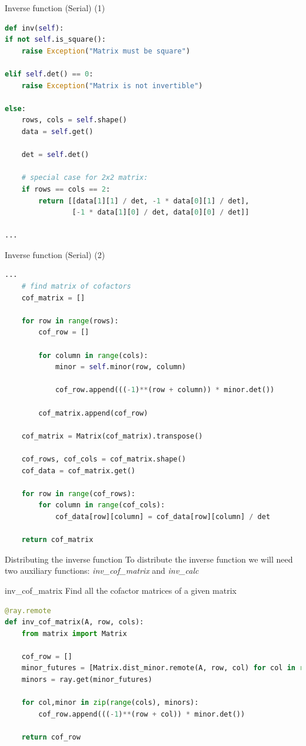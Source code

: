 \documentclass{beamer}
\begin{document}
\begin{frame}[fragile]{Inverse function (Serial) (1)}
    \begin{lstlisting}[language=Python]
def inv(self):
if not self.is_square():
    raise Exception("Matrix must be square")

elif self.det() == 0:
    raise Exception("Matrix is not invertible")

else:
    rows, cols = self.shape()
    data = self.get()

    det = self.det()

    # special case for 2x2 matrix:
    if rows == cols == 2:
        return [[data[1][1] / det, -1 * data[0][1] / det],
                [-1 * data[1][0] / det, data[0][0] / det]]

...
        \end{lstlisting}
\end{frame}

\begin{frame}[fragile]{Inverse function (Serial) (2)}
    \begin{lstlisting}[language=Python]
...
    # find matrix of cofactors
    cof_matrix = []

    for row in range(rows):
        cof_row = []

        for column in range(cols):
            minor = self.minor(row, column)

            cof_row.append(((-1)**(row + column)) * minor.det())

        cof_matrix.append(cof_row)

    cof_matrix = Matrix(cof_matrix).transpose()

    cof_rows, cof_cols = cof_matrix.shape()
    cof_data = cof_matrix.get()

    for row in range(cof_rows):
        for column in range(cof_cols):
            cof_data[row][column] = cof_data[row][column] / det

    return cof_matrix
        \end{lstlisting}
\end{frame}

\begin{frame}[fragile]{Distributing the inverse function}
    To distribute the inverse function we will need two auxiliary functions: \textit{inv\_cof\_matrix} and \textit{inv\_calc}
\end{frame}

\begin{frame}[fragile]{inv\_cof\_matrix}
    Find all the cofactor matrices of a given matrix
    \begin{lstlisting}[language=Python]
@ray.remote
def inv_cof_matrix(A, row, cols):
    from matrix import Matrix
    
    cof_row = []
    minor_futures = [Matrix.dist_minor.remote(A, row, col) for col in range(cols)]
    minors = ray.get(minor_futures)

    for col,minor in zip(range(cols), minors):
        cof_row.append(((-1)**(row + col)) * minor.det())

    return cof_row
        \end{lstlisting}
\end{frame}
\end{document}
